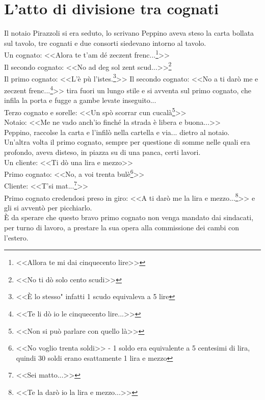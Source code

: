 
\chapter{L'atto di divisione tra cognati}
Il notaio Pirazzoli si era seduto, lo scrivano Peppino aveva steso la carta bollata sul tavolo, tre cognati e due consorti siedevano intorno al tavolo. \\
\indent Un cognato: <<Alora te t'am dé zeczent frenc...\footnote{<<Allora te mi dai cinquecento lire>>}>>\\
\indent Il secondo cognato: <<No ad deg sol zent scud...>>\footnote{<<No ti dò solo cento scudi>>}\\
\indent Il primo cognato: <<L'è pù l'istes.\footnote{<<È lo stesso" infatti 1 scudo equivaleva a 5 lire}>>
\indent Il secondo cognato: <<No a ti darò me e zeczent frenc...\footnote{<<Te li dò io le cinquecento lire...>>}>> tira fuori un lungo stile e si avventa sul primo cognato, che infila la porta e fugge a gambe levate inseguito...\\
\indent Terzo cognato e sorelle: <<Un spò scorrar cun cucalà\footnote{<<Non si può parlare con quello là>>}>>\\
\indent Notaio: <<Me ne vado anch'io finché la strada è libera e buona...>>\\
Peppino, raccolse la carta e l'infilò nella cartella e via... dietro al notaio.\\

\indent Un'altra volta il primo cognato, sempre per questione di somme nelle quali era profondo, aveva disteso, in piazza su di una panca, certi lavori.\\
\indent Un cliente: <<Ti dò una lira e mezzo>>\\
\indent Primo cognato: <<No, a voi trenta bulè\footnote{<<No voglio trenta soldi>> - 1 soldo era equivalente a 5 centesimi di lira, quindi 30 soldi erano esattamente 1 lira e mezzo}>>\\
\indent Cliente: <<T'si mat...\footnote{<<Sei matto...>>}>>\\
\indent Primo cognato credendosi preso in giro: <<A ti darò me la lira e mezzo...\footnote{<<Te la darò io la lira e mezzo...>>}>> e gli si avventò per picchiarlo.\\
\indent È da sperare che questo bravo primo cognato non venga mandato dai sindacati, per turno di lavoro, a prestare la sua opera alla commissione dei cambi con l'estero.\\


